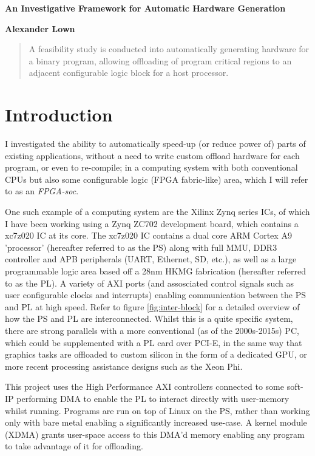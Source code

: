 \documentclass[a4paper]{article}
\begin{document}
\centerline{\Large \bf An Investigative Framework for Automatic Hardware Generation}
\medskip
\centerline{\bf Alexander Lown}
\bigskip

\begin{abstract}
  A feasibility study is conducted into automatically generating hardware for a binary program, allowing offloading of program critical regions to an adjacent configurable logic block for a host processor.
\end{abstract}

\section{Introduction}
I investigated the ability to automatically speed-up (or reduce power of) parts of existing applications, without a need to write custom offload hardware for each program, or even to re-compile; in a computing system with both conventional CPUs but also some configurable logic (FPGA fabric-like) area, which I will refer to as an \emph{FPGA-soc}.

One such example of a computing system are the Xilinx Zynq series ICs, of which I have been working using a Zynq ZC702\cite{ZC702} development board, which contains a xc7z020 IC at its core. The xc7z020 IC contains a dual core ARM Cortex A9 'processor' (hereafter referred to as the PS) along with full MMU, DDR3 controller and APB peripherals (UART, Ethernet, SD, etc.), as well as a large programmable logic area based off a 28nm HKMG fabrication (hereafter referred to as the PL). A variety of AXI ports (and assosciated control signals such as user configurable clocks and interrupts) enabling communication between the PS and PL at high speed. Refer to figure \ref{fig:inter-block} for a detailed overview of how the PS and PL are interconnected. Whilst this is a quite specific system, there are strong parallels with a more conventional (as of the 2000s-2015s) PC, which could be supplemented with a PL card over PCI-E, in the same way that graphics tasks are offloaded to custom silicon in the form of a dedicated GPU, or more recent processing assistance designs such as the Xeon Phi.

This project uses the High Performance AXI controllers connected to some soft-IP performing DMA to enable the PL to interact directly with user-memory whilst running. Programs are run on top of Linux on the PS, rather than working only with bare metal enabling a significantly increased use-case. A kernel module (XDMA) grants user-space access to this DMA'd memory enabling any program to take advantage of it for offloading.
\end{document}
